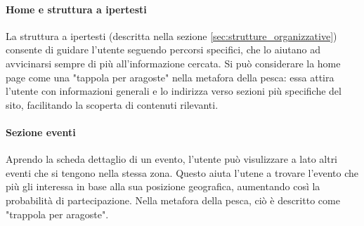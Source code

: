 \paragraph{Home e struttura a ipertesti}
La struttura a ipertesti (descritta nella sezione \ref{sec:strutture_organizzative}) consente di guidare l'utente seguendo percorsi specifici, che lo aiutano ad avvicinarsi sempre di più all'informazione cercata.
Si può considerare la home page come una "tappola per aragoste" nella metafora della pesca: essa attira l'utente con informazioni generali e lo indirizza verso sezioni più specifiche del sito, facilitando la scoperta di contenuti rilevanti.
\paragraph{Sezione eventi}
Aprendo la scheda dettaglio di un evento, l'utente può visulizzare a lato altri eventi che si tengono nella stessa zona. Questo aiuta l'utene a trovare l'evento che più gli interessa in base alla sua posizione geografica, aumentando così la probabilità di partecipazione.
Nella metafora della pesca, ciò è descritto come "trappola per aragoste".